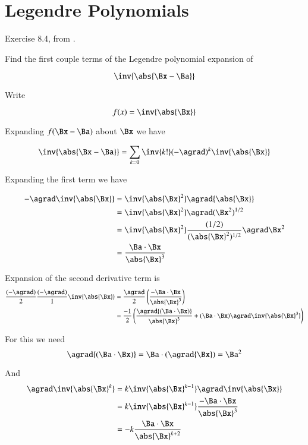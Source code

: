 \chapter{Legendre Polynomials} 
\date{ Feb 4, 2008.  $RCSfile: legendre.tex,v $ Last $Revision: 1.7 $ $Date: 2009/06/11 16:45:58 $ }

Exercise 8.4, from \cite{hestenes1999nfc}.

Find the first couple terms of the Legendre polynomial expansion of 

\[
\inv{\abs{\Bx - \Ba}}
\]

Write

\[
f(x) = \inv{\abs{\Bx}}
\]

Expanding $f(\Bx - \Ba)$ about $\Bx$ we have

\[
\inv{\abs{\Bx - \Ba}} = 
\sum_{k=0}{ \inv{k!} (-\agrad)^k} \inv{\abs{\Bx}}
\]

Expanding the first term we have

\begin{align*}
-\agrad \inv{\abs{\Bx}} 
&= 
\inv{{\abs{\Bx}}^2} \agrad {\abs{\Bx}} \\
&= 
\inv{{\abs{\Bx}}^2} \agrad (\Bx^2)^{1/2} \\
&= 
\inv{{\abs{\Bx}}^2} \frac{(1/2)}{({\abs{\Bx}}^2)^{1/2}}\agrad \Bx^2 \\
&= 
\frac{\Ba \cdot \Bx}{{\abs{\Bx}}^3} 
\end{align*}

Expansion of the second derivative term is
\begin{align*}
\frac{(-\agrad)}{2}\frac{(-\agrad)}{1}\inv{\abs{\Bx}} 
&= 
\frac{\agrad}{2} \left(\frac{-\Ba \cdot \Bx}{{\abs{\Bx}}^3}\right) \\
&= 
\frac{-1}{2}
\left( 
\frac{\agrad {(\Ba \cdot \Bx)}}{{\abs{\Bx}}^3} + {(\Ba \cdot \Bx)}\agrad \inv{{\abs{\Bx}}^3} \right) \\
\end{align*}

For this we need 
\[
\agrad {(\Ba \cdot \Bx)} = 
\Ba \cdot (\agrad {\Bx}) = \Ba^2
\]

And 
\begin{align*}
\agrad \inv{{\abs{\Bx}}^k}
&=
k \inv{{\abs{\Bx}}^{k-1}} \agrad \inv{{\abs{\Bx}}} \\
&=
k \inv{{\abs{\Bx}}^{k-1}} \frac{- \Ba \cdot \Bx }{{\abs{\Bx}}^3} \\
&=
-k \frac{\Ba \cdot \Bx }{{\abs{\Bx}}^{k+2}} \\
\end{align*}


